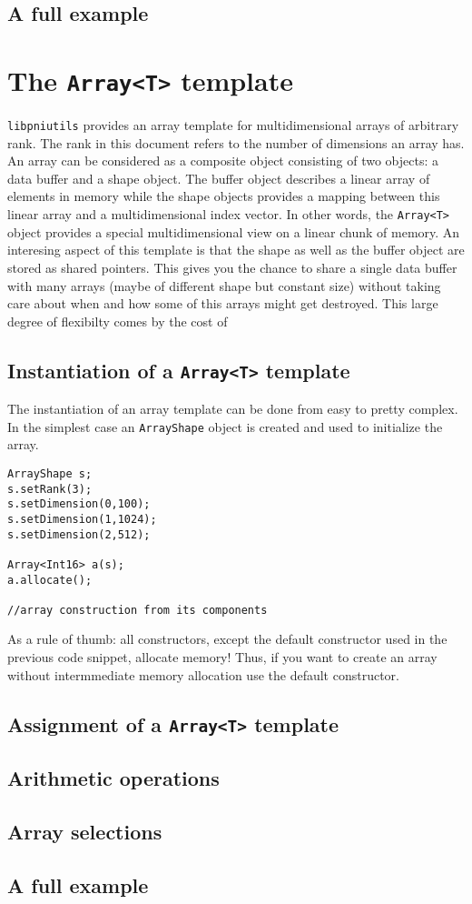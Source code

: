 \subsection{A full example}

\section{The {\tt Array<T>} template}

{\tt libpniutils} provides an array template for multidimensional arrays 
of arbitrary rank. The rank in this document refers to the number of dimensions 
an array has. An array can be considered as a composite object consisting 
of two objects: a data buffer and a shape object. 
The buffer object describes a linear array of elements in memory while the 
shape objects provides a mapping between this linear array and a
multidimensional index vector. 
In other words, the {\tt Array<T>} object provides a special multidimensional 
view on a linear chunk of memory.
An interesing aspect of this template is that the shape as well as the buffer 
object are stored as shared pointers. This gives you the chance to share 
a single data buffer with many arrays (maybe of different shape but constant
size) without taking care about when and how some of this arrays might get
destroyed. This large degree of flexibilty comes by the cost of 

\subsection{Instantiation of a {\tt Array<T>} template}

The instantiation of an array template can be done from easy to pretty complex.
In the simplest case an {\tt ArrayShape} object is created and used 
to initialize the array.

\begin{verbatim}
ArrayShape s;
s.setRank(3);
s.setDimension(0,100);
s.setDimension(1,1024);
s.setDimension(2,512);

Array<Int16> a(s);
a.allocate();

//array construction from its components
\end{verbatim}

As a rule of thumb: all constructors, except the default constructor used in the 
previous code snippet, allocate memory! 
Thus, if you want to create an array without intermmediate memory allocation 
use the default constructor.


\subsection{Assignment of a {\tt Array<T>} template}

\subsection{Arithmetic operations}

\subsection{Array selections}

\subsection{A full example}
